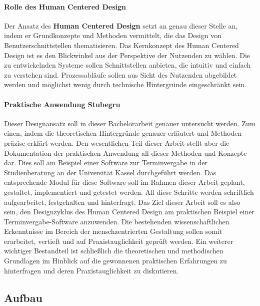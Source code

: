 \documentclass[12pt]{article}
\begin{document}
\paragraph{Rolle des Human Centered Design}
Der Ansatz des \textbf{Human Centered Design} setzt an genau dieser Stelle an,
indem er Grundkonzepte und Methoden vermittelt, die das Design von
Benutzerschnittstellen thematisieren. Das Kernkonzept des Human Centered Design
ist es den Blickwinkel aus der Perspektive der Nutzenden zu wählen. Die zu
entwickelnden Systeme sollen Schnittstellen anbieten, die intuitiv und einfach
zu verstehen sind. Prozessabläufe sollen aus Sicht des Nutzenden abgebildet
werden und möglichst wenig durch technische Hintergründe eingeschränkt sein.

\paragraph{Praktische Anwendung Stubegru}
Dieser Designansatz soll in dieser Bachelorarbeit genauer untersucht werden.
Zum einen, indem die theoretischen Hintergründe genauer erläutert und Methoden
präzise erklärt werden. Den wesentlichen Teil dieser Arbeit stellt aber die
Dokumentation der praktischen Anwendung all dieser Methoden und Konzepte dar.
Dies soll am Beispiel einer Software zur Terminvergabe in der Studienberatung
an der Universität Kassel durchgeführt werden. Das entsprechende Modul für
diese Software soll im Rahmen dieser Arbeit geplant, gestaltet, implementiert
und getestet werden. All diese Schritte werden schriftlich aufgearbeitet,
festgehalten und hinterfragt. Das Ziel dieser Arbeit soll es also sein, den
Designzyklus des Human Centered Design am praktischen Beispiel einer
Terminvergabe-Software anzuwenden. Die bestehenden wissenschaftlichen
Erkenntnisse im Bereich der menschzentrierten Gestaltung sollen somit
erarbeitet, vertieft und auf Praxistauglichkeit geprüft werden. Ein weiterer
wichtiger Bestandteil ist schließlich die theoretischen und methodischen
Grundlagen im Hinblick auf die gewonnenen praktischen Erfahrungen zu
hinterfragen und deren Praxistauglichkeit zu diskutieren.

\subsection{Aufbau}
\end{document}
